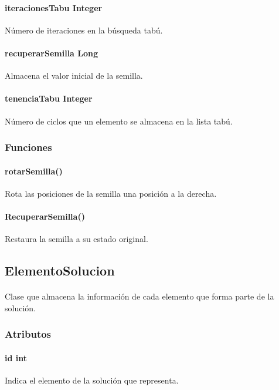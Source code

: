 \documentclass{article}
\begin{document}
	\paragraph{iteracionesTabu Integer}Número de iteraciones en la búsqueda tabú.
	
	\paragraph{recuperarSemilla Long} Almacena el valor inicial de la semilla.
	
	\paragraph{tenenciaTabu Integer} Número de ciclos que un elemento se almacena en la lista tabú.
	
	\subsubsection{Funciones}
	
	\paragraph{rotarSemilla()} Rota las posiciones de la semilla una posición a la derecha.
	
	\paragraph{RecuperarSemilla()}Restaura la semilla a su estado original.
	
	\subsection{ElementoSolucion}
	
	\paragraph{}Clase que almacena la información de cada elemento que forma parte de la solución.
	
	\subsubsection{Atributos}
	
	\paragraph{id int}Indica el elemento de la solución que representa.
	
\end{document}

